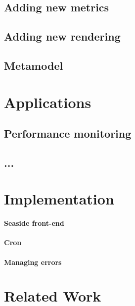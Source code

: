 \documentclass[runningheads]{llncs}
\newcommand{\seclabel}[1]{\label{sec:#1}}
\begin{document}
\subsection{Adding new metrics}

\subsection{Adding new rendering}

\subsection{Metamodel} \seclabel{metamodel}


\section{Applications} \seclabel{applications}

\subsection{Performance monitoring}

\subsection{...}


\section{Implementation} \seclabel{implementation}

\paragraph{Seaside front-end}

\paragraph{Cron}

\paragraph{Managing errors}

\section{Related Work} \seclabel{relatedwork}
\end{document}
